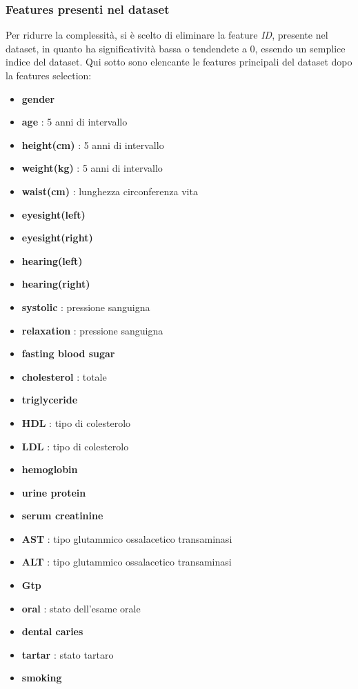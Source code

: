 \documentclass{article}
\begin{document}
\subsubsection{Features presenti nel dataset}
Per ridurre la complessità, si è scelto di eliminare la feature \textit{ID}, presente nel dataset, in quanto ha significatività bassa o tendendete a 0, essendo un semplice indice del dataset. 
Qui sotto sono elencante le features principali del dataset dopo la features selection:
\begin{itemize}
    \item \textbf{gender}
    \item \textbf{age} : 5 anni di intervallo
    \item \textbf{height(cm)} : 5 anni di intervallo
    \item \textbf{weight(kg)} : 5 anni di intervallo
    \item \textbf{waist(cm)} : lunghezza circonferenza vita
    \item \textbf{eyesight(left)}
    \item \textbf{eyesight(right)}
    \item \textbf{hearing(left)} 
    \item \textbf{hearing(right)}
    \item \textbf{systolic} : pressione sanguigna
    \item \textbf{relaxation} : pressione sanguigna
    \item \textbf{fasting blood sugar}
    \item \textbf{cholesterol} :  totale
    \item \textbf{triglyceride}
    \item \textbf{HDL} : tipo di colesterolo
    \item \textbf{LDL} : tipo di colesterolo
    \item \textbf{hemoglobin}
    \item \textbf{urine protein}
    \item \textbf{serum creatinine}
    \item \textbf{AST} : tipo glutammico ossalacetico transaminasi
    \item \textbf{ALT} : tipo glutammico ossalacetico transaminasi
    \item \textbf{Gtp} 
    \item \textbf{oral} : stato dell'esame orale
    \item \textbf{dental caries}
    \item \textbf{tartar} : stato tartaro
    \item \textbf{smoking}
\end{itemize}   
\end{document}
